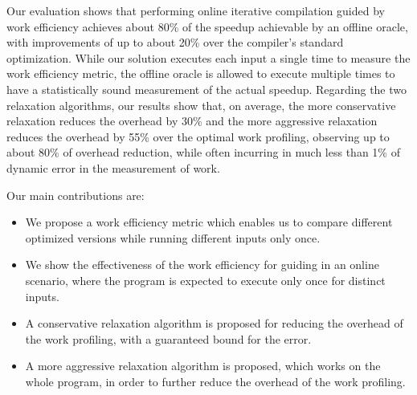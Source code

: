     Our evaluation shows that performing online iterative compilation guided by work efficiency achieves about 80\%
    of the speedup achievable by an offline oracle, with improvements of up to about 20\% over the compiler's standard optimization.
    While our solution executes each input a single time to measure the work efficiency metric, the offline oracle is allowed to execute
    multiple times to have a statistically sound measurement of the actual speedup.
    Regarding the two relaxation algorithms, our results show that, on average, the more conservative relaxation reduces the overhead by 30\%
    and the more aggressive relaxation reduces the overhead by 55\% over the optimal work profiling, observing up to about 80\% of overhead reduction,
    while often incurring in much less than 1\% of dynamic error in the measurement of work.

    Our main contributions are:

    \begin{itemize}[leftmargin=3mm]
        \item We propose a work efficiency metric which enables us to compare different optimized versions while running different inputs only once.

        \item We show the effectiveness of the work efficiency for guiding {\itercomp} in an online scenario, where the program is expected
        to execute only once for distinct inputs.

        \item A conservative relaxation algorithm is proposed for reducing the overhead of the work profiling, with a guaranteed bound for
        the error.

        \item A more aggressive relaxation algorithm is proposed, which works on the whole program, in order to further reduce the overhead
        of the work profiling.
    \end{itemize}

